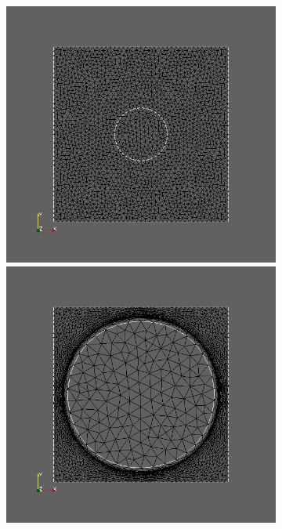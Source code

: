 \begin{figure}
	\begin{subfigure}{0.3\textwidth}
	\centering
	\includegraphics[scale=0.2]{pic_bigcircle_constlame1.jpg}
	\caption{}	
	\centering
	\includegraphics[scale=0.2]{pic_bigcircle_constlame2.jpg}

\end{subfigure}
\end{figure}
